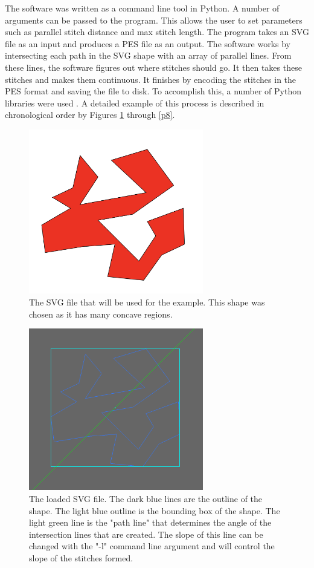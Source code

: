 \documentclass{article}
\begin{document}
The software was written as a command line tool in Python. A number of arguments can be passed to the program. This allows the user to set parameters such as parallel stitch distance and max stitch length. The program takes an SVG file as an input and produces a PES file as an output. The software works by intersecting each path in the SVG shape with an array of parallel lines. From these lines, the software figures out where stitches should go. It then takes these stitches and makes them continuous. It finishes by encoding the stitches in the PES format and saving the file to disk. To accomplish this, a number of Python libraries were used \cite{svgpathtools} \cite{numpy} \cite{pyEmbroidery}. A detailed example of this process is described in chronological order by Figures \ref{p-1} through \ref{p8}.

\begin{figure}[H]
    \centering
    \includegraphics[width=3in]{p-1}
    \caption{The SVG file that will be used for the example. This shape was chosen as it has many concave regions.}
    \label{p-1}
\end{figure}

\begin{figure}[H]
    \centering
    \includegraphics[width=3in]{p0}
    \caption{The loaded SVG file. The dark blue lines are the outline of the shape. The light blue outline is the bounding box of the shape. The light green line is the "path line" that determines the angle of the intersection lines that are created. The slope of this line can be changed with the "-l" command line argument and will control the slope of the stitches formed.}
    \label{p0}
\end{figure}
\end{document}
